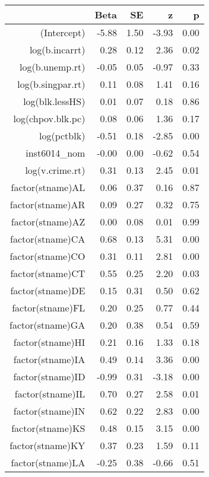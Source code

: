 \begin{table}[ht]
\centering
\begin{tabular}{rrrrr}
  \hline
 & Beta & SE & z & p \\ 
  \hline
(Intercept) & -5.88 & 1.50 & -3.93 & 0.00 \\ 
  log(b.incarrt) & 0.28 & 0.12 & 2.36 & 0.02 \\ 
  log(b.unemp.rt) & -0.05 & 0.05 & -0.97 & 0.33 \\ 
  log(b.singpar.rt) & 0.11 & 0.08 & 1.41 & 0.16 \\ 
  log(blk.lessHS) & 0.01 & 0.07 & 0.18 & 0.86 \\ 
  log(chpov.blk.pc) & 0.08 & 0.06 & 1.36 & 0.17 \\ 
  log(pctblk) & -0.51 & 0.18 & -2.85 & 0.00 \\ 
  inst6014\_nom & -0.00 & 0.00 & -0.62 & 0.54 \\ 
  log(v.crime.rt) & 0.31 & 0.13 & 2.45 & 0.01 \\ 
  factor(stname)AL & 0.06 & 0.37 & 0.16 & 0.87 \\ 
  factor(stname)AR & 0.09 & 0.27 & 0.32 & 0.75 \\ 
  factor(stname)AZ & 0.00 & 0.08 & 0.01 & 0.99 \\ 
  factor(stname)CA & 0.68 & 0.13 & 5.31 & 0.00 \\ 
  factor(stname)CO & 0.31 & 0.11 & 2.81 & 0.00 \\ 
  factor(stname)CT & 0.55 & 0.25 & 2.20 & 0.03 \\ 
  factor(stname)DE & 0.15 & 0.31 & 0.50 & 0.62 \\ 
  factor(stname)FL & 0.20 & 0.25 & 0.77 & 0.44 \\ 
  factor(stname)GA & 0.20 & 0.38 & 0.54 & 0.59 \\ 
  factor(stname)HI & 0.21 & 0.16 & 1.33 & 0.18 \\ 
  factor(stname)IA & 0.49 & 0.14 & 3.36 & 0.00 \\ 
  factor(stname)ID & -0.99 & 0.31 & -3.18 & 0.00 \\ 
  factor(stname)IL & 0.70 & 0.27 & 2.58 & 0.01 \\ 
  factor(stname)IN & 0.62 & 0.22 & 2.83 & 0.00 \\ 
  factor(stname)KS & 0.48 & 0.15 & 3.15 & 0.00 \\ 
  factor(stname)KY & 0.37 & 0.23 & 1.59 & 0.11 \\ 
  factor(stname)LA & -0.25 & 0.38 & -0.66 & 0.51 \\ 

\end{tabular}
\end{table}

